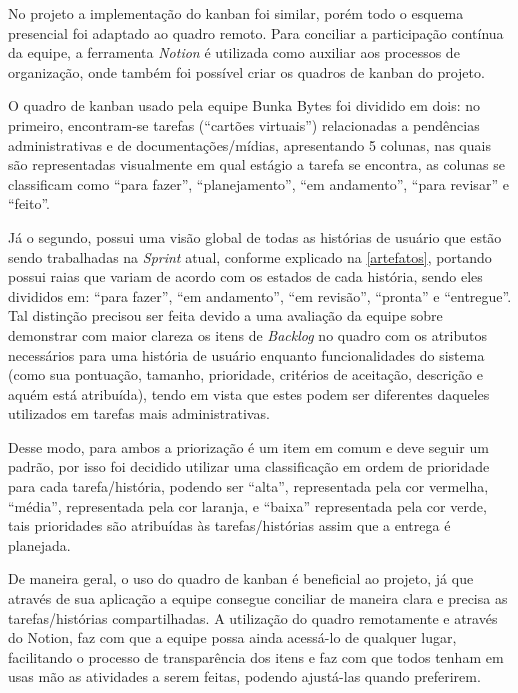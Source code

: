 No projeto a implementação do kanban foi similar, porém todo o esquema presencial foi adaptado ao quadro remoto. Para conciliar a participação contínua da equipe, a ferramenta \textsl{Notion} é utilizada como auxiliar aos processos de organização, onde também foi possível criar os quadros de kanban do projeto. 

O quadro de kanban usado pela equipe Bunka Bytes foi dividido em dois: no primeiro, encontram-se tarefas (``cartões virtuais'') relacionadas a pendências administrativas e de documentações/mídias, apresentando 5 colunas, nas quais são representadas visualmente em qual estágio a tarefa se encontra, as colunas se classificam como ``para fazer'', ``planejamento'', ``em andamento'', ``para revisar'' e ``feito''.

Já o segundo, possui uma visão global de todas as histórias de usuário que estão sendo trabalhadas na \textsl{Sprint} atual, conforme explicado na \autoref{artefatos}, portando possui raias que variam de acordo com os estados de cada história, sendo eles divididos em: ``para fazer'', ``em andamento'', ``em revisão'', ``pronta'' e ``entregue''. Tal distinção precisou ser feita devido a uma avaliação da equipe sobre demonstrar com maior clareza os itens de \textsl{Backlog} no quadro com os atributos necessários para uma história de usuário enquanto funcionalidades do sistema (como sua pontuação, tamanho, prioridade, critérios de aceitação, descrição e aquém está atribuída), tendo em vista que estes podem ser diferentes daqueles utilizados em tarefas mais administrativas.

Desse modo, para ambos a priorização é um item em comum e deve seguir um padrão, por isso foi decidido utilizar uma classificação em ordem de prioridade para cada tarefa/história, podendo ser ``alta'', representada pela cor vermelha, ``média'', representada pela cor laranja, e ``baixa'' representada pela cor verde, tais prioridades são atribuídas às tarefas/histórias assim que a entrega é planejada.

De maneira geral, o uso do quadro de kanban é beneficial ao projeto, já que através de sua aplicação a equipe consegue conciliar de maneira clara e precisa as tarefas/histórias compartilhadas. A utilização do quadro remotamente e através do Notion, faz com que a equipe possa ainda acessá-lo de qualquer lugar, facilitando o processo de transparência dos itens e faz com que todos tenham em usas mão as atividades a serem feitas, podendo ajustá-las quando preferirem. 


